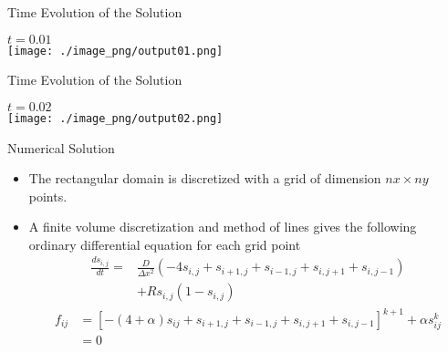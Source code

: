 \documentclass[aspectratio=43]{beamer}
\begin{document}
\begin{frame}[fragile]{Time Evolution of the Solution}
    \begin{center}
        $t=0.01$ \\
        \texttt{[image: ./image\_png/output01.png]}
    \end{center}
\end{frame}

\begin{frame}[fragile]{Time Evolution of the Solution}
    \begin{center}
        $t=0.02$ \\
        \texttt{[image: ./image\_png/output02.png]}
    \end{center}
\end{frame}

\begin{frame}[fragile]{Numerical Solution}
    \begin{itemize}
        \item The rectangular domain is discretized with a grid of  dimension $nx \times ny$ points.
        \item A finite volume discretization and method of lines gives the following ordinary differential equation for each grid point
        \begin{align}
            \frac{ds_{i,j}}{dt} =& \frac{D}{\Delta x^2} \left( -4s_{i,j} + s_{i+1,j}+ s_{i-1,j}+ s_{i,j+1}+ s_{i,j-1} \right) \nonumber\\
            &  + R s_{i,j}(1 - s_{i,j}) \nonumber
        \end{align}
        \begin{align}
            f_{ij} &= \left[ -(4+\alpha)s_{ij} + s_{i+1,j}+ s_{i-1,j}+ s_{i,j+1}+ s_{i,j-1} \right]^{k+1} + \alpha s_{ij}^{k}\nonumber \\
                   &=0 \nonumber
        \end{align}
    \end{itemize}
\end{frame}
\end{document}
